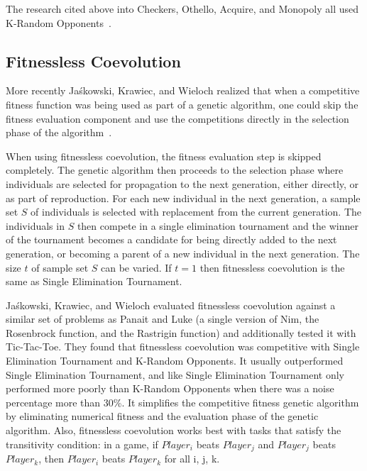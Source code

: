 The research cited above into Checkers, Othello, Acquire, and Monopoly all used
K-Random
Opponents~\cite{Fogel2000Anaconda,journals/tec/ChellapillaF01,ChongTW05,Anthony2002,DBLP:conf/cig/Frayn05}.

\subsection{Fitnessless Coevolution}

More recently Ja\'{s}kowski, Krawiec, and Wieloch realized that when a
competitive fitness function was being used as part of a genetic algorithm, one
could skip the fitness evaluation component and use the competitions directly in the
selection phase of the algorithm~\cite{Jaskowski:2008:FC:1389095.1389161}. 

When using fitnessless coevolution, the fitness evaluation step is skipped
completely. The genetic algorithm then proceeds to the selection phase where
individuals are selected for propagation to the next generation, either
directly, or as part of reproduction. For each new individual in the next
generation, a sample set \(S\) of individuals is selected with replacement from
the current generation. The individuals in \(S\) then compete in a single
elimination tournament and the winner of the tournament becomes a candidate for
being directly added to the next generation, or becoming a parent of a new
individual in the next generation. The size \(t\) of sample set \(S\) can be
varied. If \(t=1\) then fitnessless coevolution is the same as Single
Elimination Tournament.

Ja\'{s}kowski, Krawiec, and Wieloch evaluated fitnessless coevolution against a
similar set of problems as Panait and Luke (a single version of Nim, the
Rosenbrock function, and the Rastrigin function) and additionally tested it with
Tic-Tac-Toe. They found that fitnessless coevolution was competitive with Single
Elimination Tournament and K-Random Opponents. It usually outperformed Single
Elimination Tournament, and like Single Elimination Tournament only performed
more poorly than K-Random Opponents when there was a noise percentage more than
30\%. It simplifies the competitive fitness genetic algorithm by eliminating
numerical fitness and the evaluation phase of the genetic algorithm. Also,
fitnessless coevolution works best with tasks that satisfy the transitivity
condition: in a game, if \(Player_{i}\) beats \(Player_{j}\) and \(Player_{j}\)
beats \(Player_{k}\), then \(Player_{i}\) beats \(Player_{k}\) for all i, j, k.

